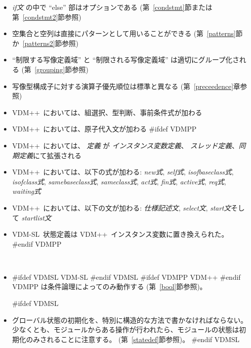 \documentclass[\pformat,12pt]{jarticle}
\newcommand{\vdmslpp}[2]{%
#ifdef VDMSL
#1
#endif VDMSL
#ifdef VDMPP
#2
#endif VDMPP
}
\newcommand{\vdmsl}{VDM-SL}
\newcommand{\vdmpp}{VDM++}
\begin{document}
\begin{description}
\begin{itemize}
  \vdmsl\ は {\em specification statement} (仕様記述文)で拡張された。
#endif VDMSL

  \item  {\it if文\/} の中で ``else'' 部はオプションである (第~\ref{condstmt}節または第~\ref{condstmt2}節参照)
        
  \item 空集合と空列は直接にパターンとして用いることができる (第~\ref{patterns}節か~\ref{patterns2}節参照)
  \item ``制限する写像定義域'' と ``制限される写像定義域'' は適切にグループ化される (第~\ref{grouping}節参照)
  \item 写像型構成子に対する演算子優先順位は標準と異なる (第~\ref{preceedence}章参照)
  \item \vdmpp\ においては、組選択、型判断、事前条件式が加わる
  \item \vdmpp\ においては、原子代入文が加わる
#ifdef VDMPP
  \item  \vdmpp\ においては、 {\em 定義} が  {\em インスタンス変数定義}、
   {\em スレッド定義}、{\em 同期定義}にて拡張される

  \item  \vdmpp\ においては、以下の式が加わる:
    {\em new式}, {\em self式}, {\em isofbaseclass式}, {\em 
    isofclass式}, {\em samebaseclass式}, {\em
    sameclass式}, {\em act式}, {\em fin式},
    {\em active式}, {\em req式}, {\em waiting式}

  \item  \vdmpp\ においては、以下の文が加わる:
 {\em  仕様記述文}, {\em select文},
 {\em start文}そして {\em startlist文} %

  \item  \vdmsl\ 状態定義は \vdmpp\ インスタンス変数に置き換えられた。
#endif VDMPP


  \end{itemize}
  
\item[意味定義上の相違 (wrt.\ インタープリタ):]\mbox{}\\[-3mm] 
  \begin{itemize}
  
  \item  \vdmslpp{\vdmsl}{\vdmpp} は条件論理によってのみ動作する (第~\ref{bool}節参照)。
    
#ifdef VDMSL
  \item グローバル状態の初期化を、特別に構造的な方法で書かなければならない。
    少なくとも、モジュールからある操作が行われたら、モジュールの状態は初期化のみされることに注意する。
    (第~\ref{statedef}節参照)。
#endif VDMSL


\end{itemize}
\end{description}
\end{document}
